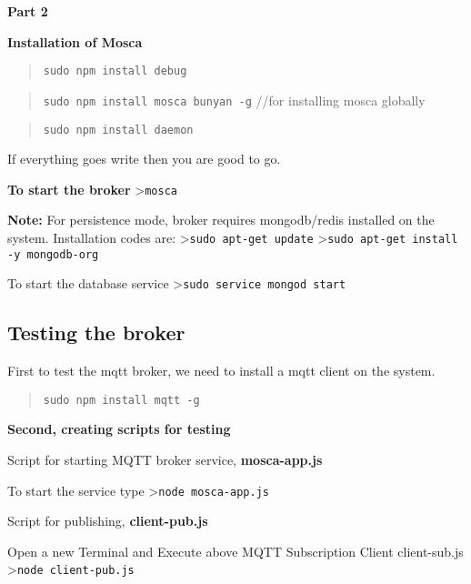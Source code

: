 \documentclass[16pt]{article}
\begin{document}
 \vspace{0.3cm}

\textbf{Part 2}

\textbf{Installation of Mosca}

\begin{quote}
\texttt{sudo npm install debug}
\end{quote}

\begin{quote}
\texttt{sudo npm install mosca bunyan -g} //for installing mosca
globally
\end{quote}

\begin{quote}
\texttt{sudo npm install daemon}
\end{quote}



If everything goes write then you are good to go.

 \vspace{0.3cm}

\textbf{To start the broker} \textgreater{}\texttt{mosca}

\textbf{Note:} For persistence mode, broker requires mongodb/redis
installed on the system. Installation codes are:
\textgreater{}\texttt{sudo apt-get update}
\textgreater{}\texttt{sudo apt-get install -y mongodb-org}

To start the database service
\textgreater{}\texttt{sudo service mongod start}

 \vspace{0.5cm}

\subsection{Testing the broker}

First to test the mqtt broker, we need to install a mqtt client on the
system.

\begin{quote}
\texttt{sudo npm install mqtt -g}
\end{quote}

\textbf{Second, creating scripts for testing}

Script for starting MQTT broker service, \textbf{mosca-app.js}

To start the service type \textgreater{}\texttt{node mosca-app.js}

\vspace{0.5cm}
Script for publishing, \textbf{client-pub.js}

Open a new Terminal and Execute above MQTT Subscription Client
client-sub.js \textgreater{}\texttt{node client-pub.js}
\end{document}
